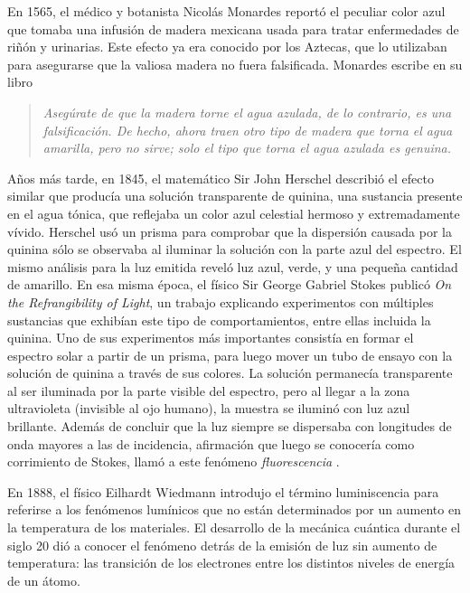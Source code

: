 \newpage


En 1565, el médico y botanista Nicolás Monardes reportó el peculiar color azul que tomaba una infusión de madera mexicana usada para tratar enfermedades de riñón y urinarias. Este efecto ya era conocido por los Aztecas, que lo utilizaban para asegurarse que la valiosa madera no fuera falsificada. Monardes escribe en su libro \cite{[MONARDES]}

\begin{quote}
    \textit{Asegúrate de que la madera torne el agua azulada, de lo contrario, es una falsificación. De hecho, ahora traen otro tipo de madera que torna el agua amarilla, pero no sirve; solo el tipo que torna el agua azulada es genuina.}
\end{quote}  

\noindent Años más tarde, en 1845, el matemático Sir John Herschel describió el efecto similar que producía una solución transparente de quinina, una sustancia presente en el agua tónica, que reflejaba \flqq un color azul celestial hermoso y extremadamente vívido\frqq.
Herschel usó un prisma para comprobar que la dispersión causada por la quinina sólo se observaba al iluminar la solución con la parte azul del espectro.
El mismo análisis para la luz emitida reveló luz azul, verde, y una pequeña cantidad de amarillo.
En esa misma época, el físico Sir George Gabriel Stokes publicó \textit{On the Refrangibility of Light}, un trabajo explicando experimentos con múltiples sustancias que exhibían este tipo de comportamientos, entre ellas incluida la quinina.
Uno de sus experimentos más importantes consistía en formar el espectro solar a partir de un prisma, para luego mover un tubo de ensayo con la solución de quinina a través de sus colores.
La solución permanecía transparente al ser iluminada por la parte visible del espectro, pero al llegar a la zona ultravioleta (invisible al ojo humano), la muestra se iluminó con luz azul brillante.
Además de concluir que la luz siempre se dispersaba con longitudes de onda mayores a las de incidencia, afirmación que luego se conocería como corrimiento de Stokes, llamó a este fenómeno \textit{fluorescencia} \cite{[VALEUR HISTORY]}.

En 1888, el físico Eilhardt Wiedmann introdujo el término luminiscencia para referirse a los fenómenos lumínicos que no están determinados por un aumento en la temperatura de los materiales.
El desarrollo de la mecánica cuántica durante el siglo 20 dió a conocer el fenómeno detrás de la emisión de luz sin aumento de temperatura: las transición de los electrones entre los distintos niveles de energía de un átomo. 



